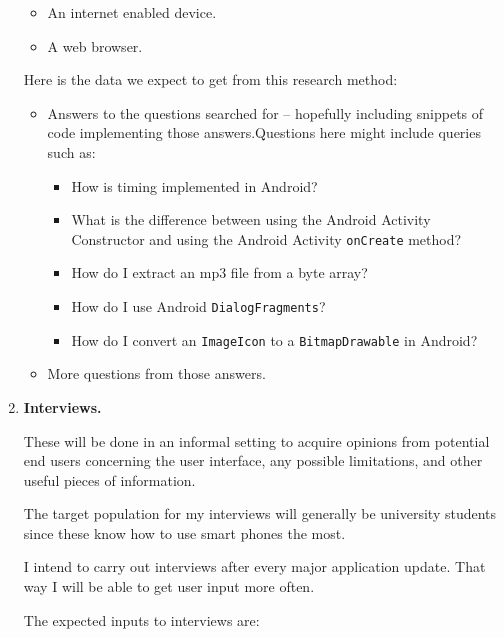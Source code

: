 \documentclass[12pt,svgnames,smaller]{article} %
\begin{document}
\begin{enumerate}
		\begin{itemize}
			\item An internet enabled device.
			\item A web browser. 
		\end{itemize}
		
		Here is the data we expect to get from this research method:
		
		\begin{itemize}
			\item Answers to the questions searched for – hopefully including snippets of code implementing those answers.Questions here might include queries such as:
			
			\begin{itemize}
				\item How is timing implemented in Android?
				\item What is the difference between using the Android Activity Constructor and using the Android Activity \texttt{onCreate} method?
				\item How do I extract an mp3 file from a byte array?
				\item How do I use Android \texttt{DialogFragments}?
				\item How do I convert an \texttt{ImageIcon} to a \texttt{BitmapDrawable} in Android?
			\end{itemize} 
			
			\item More questions from those answers.
		\end{itemize}
		
		
		\item \textbf{Interviews.}
		
		These will be done in an informal setting to acquire opinions from potential end users concerning the user interface, any possible limitations, and other useful pieces of information.
		
		The target population for my interviews will generally be university students since these know how to use smart phones the most.
		
		I intend to carry out interviews after every major application update. That way I will be able to get user input more often.
		
		The expected inputs to interviews are: 
		

\end{enumerate}
\end{document}
